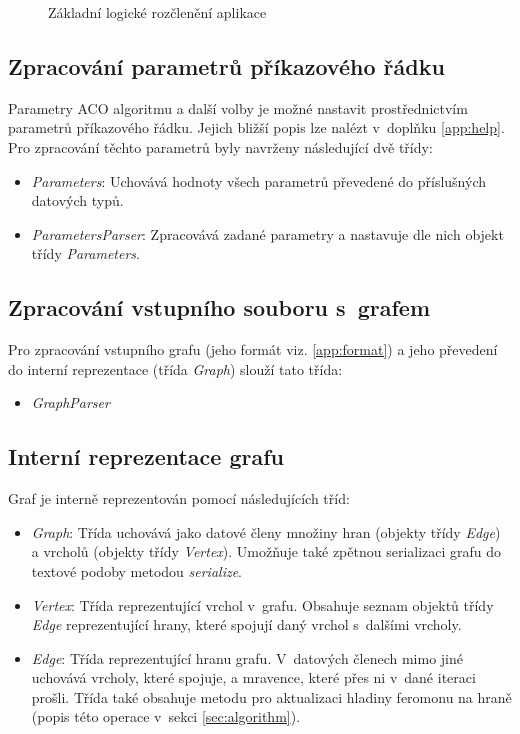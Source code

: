 \documentclass[a4paper, 12pt]{article}
\begin{document}
\begin{figure}[b]
  \begin{center}
    
  \end{center}
\caption{Základní logické rozčlenění aplikace}
\label{img:logika}
\end{figure}


\subsection{Zpracování parametrů příkazového řádku}
\label{subsec:process}
Parametry ACO algoritmu a další volby je možné nastavit prostřednictvím parametrů příkazového řádku. Jejich bližší popis lze nalézt v~doplňku \ref{app:help}.
Pro zpracování těchto parametrů byly navrženy následující dvě třídy:
\begin{itemize}
  \item \emph{Parameters}: Uchovává hodnoty všech parametrů převedené do příslušných datových typů.
  \item \emph{ParametersParser}: Zpracovává zadané parametry a nastavuje dle nich objekt třídy \emph{Parameters}.
\end{itemize}

\subsection{Zpracování vstupního souboru s~grafem}
Pro zpracování vstupního grafu (jeho formát viz. \ref{app:format}) a jeho převedení do interní reprezentace (třída \emph{Graph}) slouží tato třída:
\begin{itemize}
  \item \emph{GraphParser}
\end{itemize}

\subsection{Interní reprezentace grafu}
\label{subsec:graph}
Graf je interně reprezentován pomocí následujících tříd:
\begin{itemize}
  \item \emph{Graph}: Třída uchovává jako datové členy množiny hran (objekty třídy \emph{Edge}) a vrcholů (objekty třídy \emph{Vertex}).
    Umožňuje také zpětnou serializaci grafu do textové podoby metodou \emph{serialize}.

  \item \emph{Vertex}: Třída reprezentující vrchol v~grafu. Obsahuje seznam objektů třídy \emph{Edge} reprezentující hrany, které spojují daný vrchol s~dalšími
    vrcholy.

  \item \emph{Edge}: Třída reprezentující hranu grafu. V~datových členech mimo jiné uchovává vrcholy, které spojuje,
    a mravence, které přes ni v~dané iteraci prošli. Třída také obsahuje metodu pro aktualizaci hladiny feromonu na hraně
    (popis této operace v~sekci \ref{sec:algorithm}).
\end{itemize}
\end{document}
